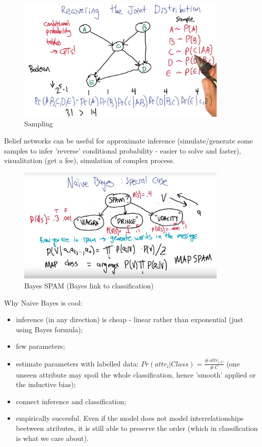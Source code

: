 \documentclass[11pt]{article}
\begin{document}
\begin{figure}[htbp] 
	\centering
	\includegraphics[width=0.9\textwidth]{pics/belief_network1}
	\caption{Sampling} 
	\label{belief_network1}
\end{figure}
Belief networks can be useful for approximate inference (simulate/generate some samples to infer 'reverse' conditional probability - easier to solve and faster), visualitation (get a fee), simulation of complex process. 

\begin{figure}[htbp] 
	\centering
	\includegraphics[width=0.9\textwidth]{pics/Bayesian_special_case}
	\caption{Bayes SPAM (Bayes link to classification)} 
	\label{Bayesian_special_case}
\end{figure}

Why Naive Bayes is cool:
\begin{itemize}
	\item inference (in any direction) is cheap - linear rather than exponential (just using Bayes formula);
	\item few parameters;
	\item estimate parameters with labelled data: $Pr(attr_i | Class) = \frac{\# \, attr_{i,C}}{\# \, C}$ (one unseen attribute may spoil the whole classification, hence 'smooth' applied or the inductive bias);
	\item connect inference and classification;
	\item empirically succesful. Even if the model does not model interrelationships beetween atributes, it is still able to preserve the order (which in classification is what we care about).	 
\end{itemize}
\end{document}
